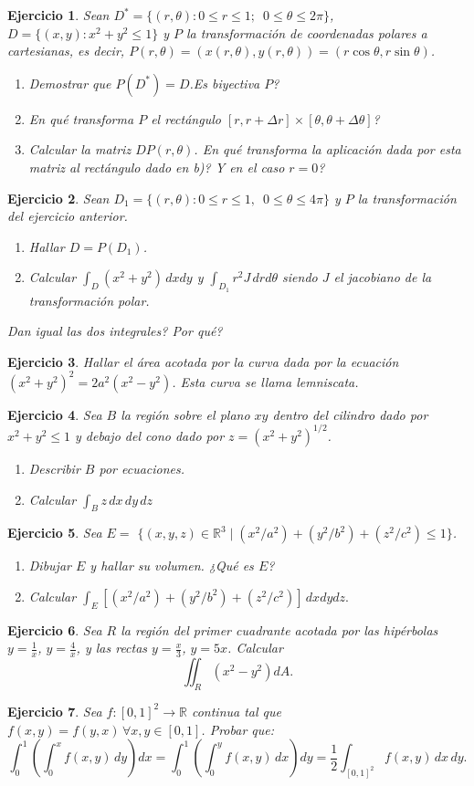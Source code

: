 \documentclass[11pt,a4paper,pdftex]{amsart}
\newtheorem{ej}{Ejercicio}%
\numberwithin{equation}{section}%
\newcommand{\bej}[1]{\begin{ej}\rm{#1}}
\newcommand{\eej}{\end{ej}\vspace{-0.2cm}}
\newcommand{\0}{\mathbb O}
\newcommand{\8}{\infty}
\begin{document}
\bej
Sean $D^{*}=\{(r,\theta ):0\le r\le 1; \,\,\, 0\le \theta \le 2\pi \}$, $%
D=\{(x,y):x^2+y^2\le 1\}$ y $P$ la transformaci\'{o}n de coordenadas polares
a cartesianas, es decir, $P(r,\theta )=(x(r,\theta ),y(r,\theta ))=(r\cos
\theta ,r\sin \theta )$.
\begin{enumerate}
\item Demostrar que $P(D^{*})=D$.\thinspace \textquestiondown Es biyectiva $P$?
\item \textquestiondown En qu\'e transforma $P$ el rect\'{a}ngulo $[r,r+\Delta
r]\times [\theta ,\theta +\Delta \theta ]$?
\item Calcular la matriz $DP(r,\theta )$. \textquestiondown En qu\'e
transforma la aplicaci\'{o}n dada por esta matriz al rect\'{a}ngulo dado en
b)? \textquestiondown Y en el caso $r=0$?
\end{enumerate}
\eej

\bej Sean $D_1=\{(r,\theta ):0\le r\le 1, \,\,\, 0\le \theta \le 4\pi \}$ y $P$ la
transformaci\'{o}n del ejercicio anterior.
\begin{enumerate}
\item Hallar $D=P(D_1)$.
\item Calcular $\int_D(x^2+y^2)\,dxdy$ y $\int_{D_1}r^2J\,drd\theta $ siendo
$J$ el jacobiano de la transformaci\'{o}n polar.
\end{enumerate}
\textquestiondown Dan igual las dos integrales? \textquestiondown Por qu\'{e}?
\eej

\bej Hallar el \'{a}rea acotada por la curva dada por la ecuaci\'{o}n $%
(x^2+y^2)^2=2a^2(x^2-y^2)$. Esta curva se llama lemniscata.

\eej






\bej Sea $B$ la regi\'{o}n sobre el plano $xy$ dentro del cilindro dado por $x^2+y^2\le 1$ y debajo del cono dado por $z=(x^2+y^2)^{1/2}$.
\begin{enumerate}
    \item Describir $B$ por ecuaciones.
    \item Calcular $\int_Bz\,dx\,dy\,dz$ 
\end{enumerate}
\eej




\bej Sea $E =$ $ \{(x,y,z) \in \mathbb{R}^3 \mid (x^2/a^2)+(y^2/b^2)+(z^2/c^2)\leq 1 \}$.
\begin{enumerate}
\item Dibujar $E$ y hallar su volumen. ¿Qué es $E$?
\item Calcular $\int_E[(x^2/a^2)+(y^2/b^2)+(z^2/c^2)]\,dxdydz. $
\end{enumerate}
\eej

\bej
Sea $R$ la región del primer cuadrante acotada por las hipérbolas $y = \frac{1}{x}$, $y = \frac{4}{x}$, y las rectas $y = \frac{x}{3}$, $y = 5x$. Calcular
\[
\iint_R \left(x^2 - y^2\right) dA.
\]
\eej

\bej
Sea $f : [0, 1]^2 \to \mathbb{R}$ continua tal que $f(x, y) = f(y, x) \, \forall x, y \in [0, 1]$. Probar que:
\[
\int_0^1 \left( \int_0^x f(x, y) \, dy \right) dx = \int_0^1 \left( \int_0^y f(x, y) \, dx \right) dy = \frac{1}{2} \int_{[0,1]^2} f(x, y) \, dx \, dy.
\]
\eej
\end{document}
